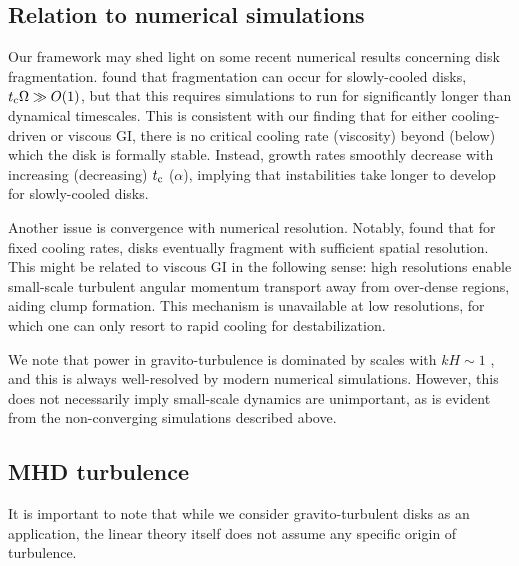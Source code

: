 \subsection{Relation to numerical simulations}\label{prev_works}
Our framework may shed light on 
some recent numerical results concerning disk
fragmentation.  \cite{paardekooper12} found that fragmentation can occur for 
slowly-cooled disks, $t_\mathrm{c}\Omega\gg O(1)$, but that this requires  
simulations to run for significantly longer than dynamical 
timescales. This is consistent with our finding
that for either cooling-driven or viscous GI, there is no critical 
cooling rate (viscosity) beyond (below) which the disk is  
formally stable. Instead, growth rates smoothly decrease with
increasing (decreasing) $t_\mathrm{c}$ ($\alpha$), implying that
instabilities take longer to develop for slowly-cooled disks.        

Another issue is convergence with numerical resolution. Notably, 
\cite{baehr15} found that for fixed cooling rates, disks eventually 
fragment with sufficient spatial resolution. %
This might be related to viscous GI in the following sense: high
resolutions enable small-scale turbulent angular momentum transport
away from over-dense regions, aiding clump formation. This 
mechanism is unavailable at low resolutions, for which one can only
resort to rapid cooling for destabilization.       
 
We note that power in gravito-turbulence is dominated by scales with
$kH\sim 1$ \citep{cossins09}, and this is always  
well-resolved by modern numerical simulations. However, this does not
necessarily imply small-scale dynamics are unimportant, as is evident
from the non-converging simulations described above.   


\subsection{MHD turbulence}%
It is important to note that while we consider gravito-turbulent disks  
as an application, the linear theory itself does not assume any 
specific origin of turbulence. 

